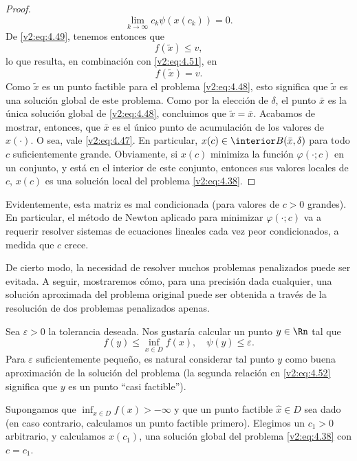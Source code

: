 \begin{proof}
\[        \lim_{k \to \infty} c_k \psi(x(c_k)) = 0.
    \]
    De \eqref{v2:eq:4.49}, tenemos entonces que
    \[
        f(\tilde{x}) \le v,
    \]
    lo que resulta, en combinación con \eqref{v2:eq:4.51}, en
    \[
        f(\tilde{x}) = v.
    \]
    Como $\tilde{x}$ es un punto factible para el problema \eqref{v2:eq:4.48}, esto significa que $\tilde{x}$ es una solución global de este problema.
    Como por la elección de $\delta$, el punto $\bar{x}$ es la única solución global de \eqref{v2:eq:4.48}, concluimos que $\tilde{x} = \bar{x}$. Acabamos de mostrar, entonces, que $\bar{x}$ es el único punto de acumulación de los valores de $x(\cdot)$. O sea, vale \eqref{v2:eq:4.47}. En particular, $x(c) \in \interior B(\bar{x}, \delta)$ para todo $c$ suficientemente grande. Obviamente, si $x(c)$ minimiza la función $\varphi(\cdot; c)$ en un conjunto, y está en el interior de este conjunto, entonces sus valores locales de $c$, $x(c)$ es una solución local del problema \eqref{v2:eq:4.38}.
\end{proof}

Evidentemente, esta matriz es mal condicionada (para valores de $c > 0$ grandes). En particular, el método de Newton aplicado para minimizar $\varphi(\cdot; c)$ va a requerir resolver sistemas de ecuaciones lineales cada vez peor condicionados, a medida que $c$ crece.

De cierto modo, la necesidad de resolver muchos problemas penalizados puede ser evitada. A seguir, mostraremos cómo, para una precisión dada cualquier, una solución aproximada del problema original puede ser obtenida a través de la resolución de dos problemas penalizados apenas.

Sea $\varepsilon > 0$ la tolerancia deseada. Nos gustaría calcular un punto $y \in \Rn$ tal que
\begin{equation}
    f(y) \le \inf_{x \in D} f(x), \quad \psi(y) \le \varepsilon.
    \label{v2:eq:4.52}
\end{equation}
Para $\varepsilon$ suficientemente pequeño, es natural considerar tal punto $y$ como buena aproximación de la solución del problema (la segunda relación en \eqref{v2:eq:4.52} significa que $y$ es un punto ``casi factible'').

Supongamos que $\inf_{x \in D} f(x) > -\infty$ y que un punto factible $\hat{x} \in D$ sea dado (en caso contrario, calculamos un punto factible primero). Elegimos un $c_1 > 0$ arbitrario, y calculamos $x(c_1)$, una solución global del problema \eqref{v2:eq:4.38} con $c = c_1$.

